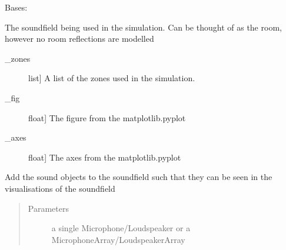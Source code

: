\documentclass[letterpaper,10pt,english]{sphinxmanual}
\begin{document}

\begin{fulllineitems}
\label{\detokenize{source/pyzones:pyzones.Soundfield}}
Bases: {\hyperref[\detokenize{source/pyzones:pyzones.Rectangle}]{}}

The soundfield being used in the simulation. Can be thought of as the room, however no room reflections are modelled
\begin{description}
\item[{\_zones}] \leavevmode{[}list{]}
A list of the zones used in the simulation.

\item[{\_fig}] \leavevmode{[}float{]}
The figure from the matplotlib.pyplot

\item[{\_axes}] \leavevmode{[}float{]}
The axes from the matplotlib.pyplot

\end{description}

\begin{fulllineitems}
\label{\detokenize{source/pyzones:pyzones.Soundfield.add_sound_objects}}
Add the sound objects to the soundfield such that they can be seen in the visualisations of the soundfield
\begin{quote}\begin{description}
\item[{Parameters}] \leavevmode
{} \textendash{} a single Microphone/Loudspeaker or a MicrophoneArray/LoudspeakerArray

\end{description}\end{quote}

\end{fulllineitems}



\end{fulllineitems}
\end{document}

